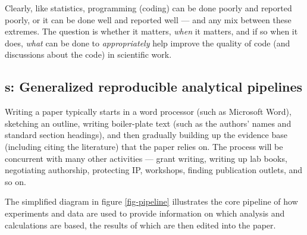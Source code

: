 \documentclass{comjnl}
\begin{document}
Clearly, like statistics, programming (coding) can be done poorly and reported poorly, or it can be done well and reported well --- and any mix between these extremes. The question is whether it matters, \emph{when\/} it matters, and if so when it does, \emph{what\/} can be done to \emph{appropriately\/} help improve the quality of code (and discussions about the code) in scientific work.


\subsection{\RAPstar s: Generalized reproducible analytical pipelines}\label{RAP-section}
Writing a paper typically starts in a word processor (such as Microsoft Word), sketching an outline, writing boiler-plate text (such as the authors' names and standard section headings), and then gradually building up the evidence base (including citing the literature) that the paper relies on. The process will be concurrent with many other activities --- grant writing, writing up lab books, negotiating authorship, protecting IP, workshops, finding publication outlets, and so on.

The simplified diagram in figure \ref{fig-pipeline} illustrates the core pipeline of how experiments and data are used to provide information on which analysis and calculations are based, the results of which are then edited into the paper.
\end{document}
